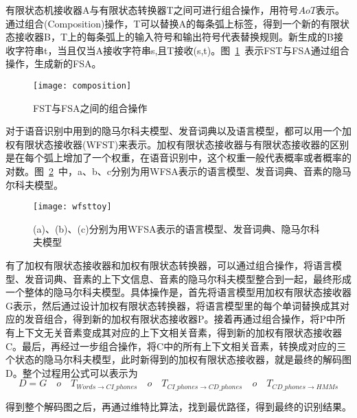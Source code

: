 有限状态机接收器A与有限状态转换器T之间可进行组合操作，用符号$AoT$表示。通过组合(Composition)操作，T可以替换A的每条弧上标签，得到一个新的有限状态接收器B，T上的每条弧上的输入符号和输出符号代表替换规则。新生成的B接收字符串t，当且仅当A接收字符串s,且T接收(s,t)。图~\ref{fig:composition}~表示FST与FSA通过组合操作，生成新的FSA。
\begin{figure}[htbp]
\centering
\texttt{[image: composition]}
\caption{FST与FSA之间的组合操作}\label{fig:composition}
\vspace{\baselineskip}
\end{figure}

对于语音识别中用到的隐马尔科夫模型、发音词典以及语言模型，都可以用一个加权有限状态接收器(WFST)来表示。加权有限状态接收器与有限状态接收器的区别是在每个弧上增加了一个权重，在语音识别中，这个权重一般代表概率或者概率的对数。图~\ref{fig:wfsttoy}~中，a、b、c分别为用WFSA表示的语言模型、发音词典、音素的隐马尔科夫模型。
\begin{figure}[htbp]
\centering
\texttt{[image: wfsttoy]}
\caption{(a)、(b)、(c)分别为用WFSA表示的语言模型、发音词典、隐马尔科夫模型\cite{mohri2002weighted}}\label{fig:wfsttoy}
\vspace{\baselineskip}
\end{figure}

有了加权有限状态接收器和加权有限状态转换器，可以通过组合操作，将语言模型、发音词典、音素的上下文信息、音素的隐马尔科夫模型整合到一起，最终形成一个整体的隐马尔科夫模型。具体操作是，首先将语言模型用加权有限状态接收器G表示，然后通过设计加权有限状态转换器，将语言模型里的每个单词替换成其对应的发音组合，得到新的加权有限状态接收器P。接着再通过组合操作，将P中所有上下文无关音素变成其对应的上下文相关音素，得到新的加权有限状态接收器C。最后，再经过一步组合操作，将C中的所有上下文相关音素，转换成对应的三个状态的隐马尔科夫模型，此时新得到的加权有限状态接收器，就是最终的解码图D。整个过程用公式可以表示为\begin{equation}D=G\quad o \quad T_{Words\rightarrow CI\_phones} \quad o \quad T_{CI\_phones\rightarrow CD\_phones} \quad o \quad T_{CD\_phones \rightarrow HMMs}\end{equation}

得到整个解码图之后，再通过维特比算法，找到最优路径，得到最终的识别结果。

